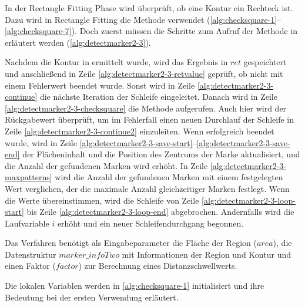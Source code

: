 In der Rectangle Fitting Phase wird überprüft, ob eine Kontur ein Rechteck ist. Dazu wird in Rectangle Fitting die
 Methode  verwendet (\autoref{alg:checksquare-1}--\autoref{alg:checksquare-7}). Doch zuerst
 müssen die Schritte zum Aufruf der Methode in  erläutert werden
 (\autoref{alg:detectmarker2-3}).



Nachdem die Kontur in  ermittelt wurde, wird das Ergebnis in $\mathit{ret}$ gespeichtert und
 anschließend in Zeile \ref{alg:detectmarker2-3-retvalue} geprüft, ob  nicht mit einem
 Fehlerwert beendet wurde. Sonst wird in Zeile \ref{alg:detectmarker2-3-continue} die nächste Iteration der Schleife
 eingeleitet. Danach wird in Zeile \ref{alg:detectmarker2-3-checksquare} die Methode  aufgerufen.
 Auch hier wird der Rückgabewert überprüft, um im Fehlerfall einen neuen Durchlauf der Schleife in Zeile
 \ref{alg:detectmarker2-3-continue2} einzuleiten. Wenn  erfolgreich beendet wurde, wird in Zeile
 \ref{alg:detectmarker2-3-save-start}--\ref{alg:detectmarker2-3-save-end} der Flächeninhalt und die Position des
 Zentrums der Marke aktualisiert, und die Anzahl der gefundenen Marken wird erhöht. In Zeile
 \ref{alg:detectmarker2-3-maxpatterns} wird die Anzahl der gefundenen Marken mit einem festgelegten Wert verglichen, der
 die maximale Anzahl gleichzeitiger Marken festlegt. Wenn die Werte übereinstimmen, wird die Schleife von Zeile
 \ref{alg:detectmarker2-3-loop-start} bis Zeile \ref{alg:detectmarker2-3-loop-end} abgebrochen. Andernfalls wird die
 Laufvariable $i$ erhöht und ein neuer Schleifendurchgang begonnen.

Das Verfahren  benötigt als Eingabeparameter die Fläche der Region ($\mathit{area}$), die
 Datenstruktur $\mathit{marker\_infoTwo}$ mit Informationen der Region und Kontur und einen Faktor ($\mathit{factor}$)
 zur Berechnung eines Distanzschwellwerts.



Die lokalen Variablen werden in \autoref{alg:checksquare-1} initialisiert und ihre Bedeutung bei der ersten Verwendung erläutert.



